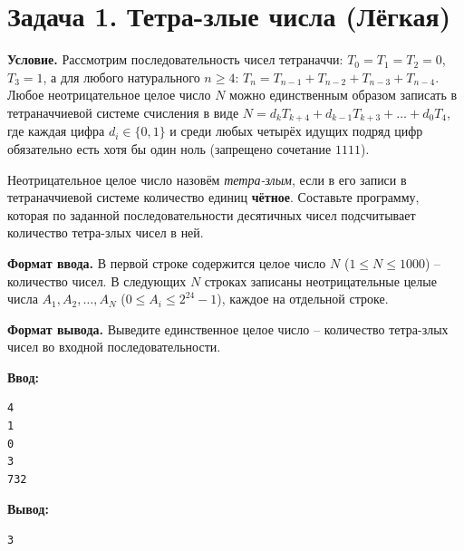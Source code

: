 \section*{Задача 1. Тетра-злые числа (Лёгкая)}
\textbf{Условие.} Рассмотрим последовательность чисел тетраначчи: $T_0 = T_1 = T_2 = 0$, $T_3 = 1$, а для любого натурального $n \ge 4$: $T_n = T_{n-1} + T_{n-2} + T_{n-3} + T_{n-4}$. Любое неотрицательное целое число $N$ можно единственным образом записать в тетраначчиевой системе счисления в виде $N = d_k T_{k+4} + d_{k-1} T_{k+3} + \dots + d_0 T_4$, где каждая цифра $d_i \in \{0, 1\}$ и среди любых четырёх идущих подряд цифр обязательно есть хотя бы один ноль (запрещено сочетание $1111$).

Неотрицательное целое число назовём \textit{тетра-злым}, если в его записи в тетраначчиевой системе количество единиц \textbf{чётное}. Составьте программу, которая по заданной последовательности десятичных чисел подсчитывает количество тетра-злых чисел в ней.

\textbf{Формат ввода.} В первой строке содержится целое число $N$ ($1 \le N \le 1000$) -- количество чисел. В следующих $N$ строках записаны неотрицательные целые числа $A_1, A_2, \dots, A_N$ ($0 \le A_i \le 2^{24}-1$), каждое на отдельной строке.

\textbf{Формат вывода.} Выведите единственное целое число -- количество тетра-злых чисел во входной последовательности.

\begin{examplebox}
  \begin{minipage}[t]{0.48\linewidth}
    \textbf{Ввод:}\\
    \begin{verbatim}
4
1
0
3
732
    \end{verbatim}
  \end{minipage}%
  \hfill%
  \begin{minipage}[t]{0.48\linewidth}
    \textbf{Вывод:}\\
    \begin{verbatim}
3
    \end{verbatim}
  \end{minipage}
\end{examplebox}